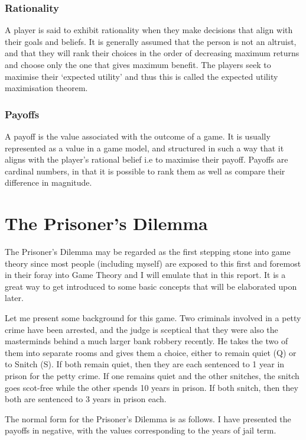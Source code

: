 \documentclass[11pt]{article}
\theoremstyle{definition}
\begin{document}
\subsubsection{Rationality}
	A player is said to exhibit rationality when they make decisions that align with their goals and beliefs. It is generally assumed that the person is not an altruist, and that they will rank their choices in the order of decreasing maximum returns and choose only the one that gives maximum benefit. The players seek to maximise their ‘expected utility’ and thus this is called the expected utility maximisation theorem.
	
\subsubsection{Payoffs}
	A payoff is the value associated with the outcome of a game. It is usually represented as a value in a game model, and structured in such a way that it aligns with the player’s rational belief i.e to maximise their payoff. Payoffs are cardinal numbers, in that it is possible to rank them as well as compare their difference in magnitude.

\section{The Prisoner's Dilemma}

The Prisoner’s Dilemma may be regarded as the first stepping stone into game theory since most people (including myself) are exposed to this first and foremost in their foray into Game Theory and I will emulate that in this report. It is a great way to get introduced to some basic concepts that will be elaborated upon later.

Let me present some background for this game. Two criminals involved in a petty crime have been arrested, and the judge is sceptical that they were also the masterminds behind a much larger bank robbery recently. He takes the two of them into separate rooms and gives them a choice, either to remain quiet (Q) or to Snitch (S). If both remain quiet, then they are each sentenced to 1 year in prison for the petty crime. If one remains quiet and the other snitches, the snitch goes scot-free while the other spends 10 years in prison. If both snitch, then they both are sentenced to 3 years in prison each.

The normal form for the Prisoner’s Dilemma is as follows. I have presented the payoffs in negative, with the values corresponding to the years of jail term.
\end{document}
